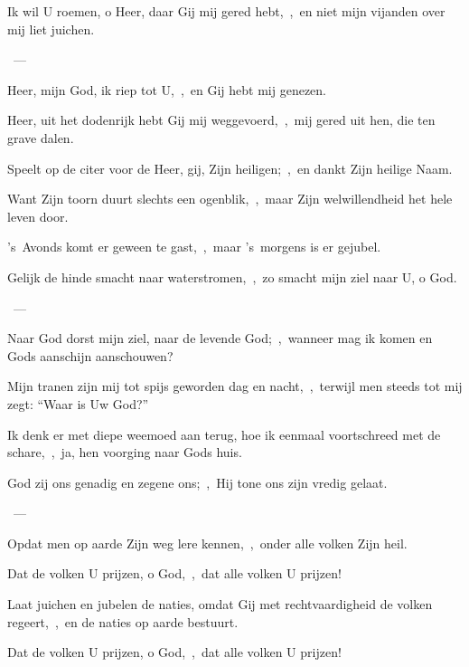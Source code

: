 \documentclass[12pt,twoside,a5paper]{article}
\begin{document}
\begin{halfparskip}
  Ik wil U roemen, o Heer, daar Gij mij gered hebt,~\sep\ en niet mijn vijanden over mij liet juichen.

  ~--- 

  Heer, mijn God, ik riep tot U,~\sep\ en Gij hebt mij genezen.

  Heer, uit het dodenrijk hebt Gij mij weggevoerd,~\sep\ mij gered uit hen, die ten grave dalen.

  Speelt op de citer voor de Heer, gij, Zijn heiligen;~\sep\ en dankt Zijn heilige Naam.

  Want Zijn toorn duurt slechts een ogenblik,~\sep\ maar Zijn welwillendheid het hele leven door.

  's~Avonds komt er geween te gast,~\sep\ maar 's~morgens is er gejubel.
\end{halfparskip}

\begin{halfparskip}
   
\end{halfparskip}

\begin{halfparskip}
  Gelijk de hinde smacht naar waterstromen,~\sep\ zo smacht mijn ziel naar U, o God.

  ~--- 

  Naar God dorst mijn ziel, naar de levende God;~\sep\ wanneer mag ik komen en Gods aanschijn aanschouwen?

  Mijn tranen zijn mij tot spijs geworden dag en nacht,~\sep\ terwijl men steeds tot mij zegt: ``Waar is Uw God?''

  Ik denk er met diepe weemoed aan terug, hoe ik eenmaal voortschreed met de schare,~\sep\ ja, hen voorging naar Gods huis.
\end{halfparskip}

\begin{halfparskip}
   
\end{halfparskip}

\begin{halfparskip}
  God zij ons genadig en zegene ons;~\sep\ Hij tone ons zijn vredig gelaat.

  ~--- 

  Opdat men op aarde Zijn weg lere kennen,~\sep\ onder alle volken Zijn heil.

  Dat de volken U prijzen, o God,~\sep\ dat alle volken U prijzen!

  Laat juichen en jubelen de naties, omdat Gij met rechtvaardigheid de volken regeert,~\sep\ en de naties op aarde bestuurt.

  Dat de volken U prijzen, o God,~\sep\ dat alle volken U prijzen!
\end{halfparskip}
\end{document}
